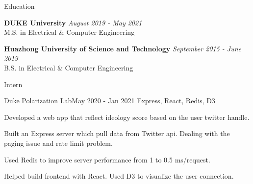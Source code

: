 \documentclass{cv}
\begin{document}
	\begin{rSection}
		{Education}

		{\bf DUKE University} \hfill {\em August 2019 - May 2021} \\ M.S. in Electrical
		\& Computer Engineering

		{\bf Huazhong University of Science and Technology } \hfill
		{\em September 2015 - June 2019} \\ B.S. in Electrical \& Computer Engineering
	\end{rSection}

	\begin{rSection}
		{Intern}
		\begin{rSubsection}
			{Duke Polarization Lab}{May 2020 - Jan 2021} {Express, React, Redis, D3}{}
			\item Developed a web app that reflect ideology score based on the user twitter
			handle. \item Built an Express server which pull data from Twitter api. Dealing
			with the paging issue and rate limit problem. \item Used Redis to improve
			server performance from 1 to 0.5 ms/request. \item Helped build frontend with
			React. Used D3 to visualize the user connection.
		\end{rSubsection}
	\end{rSection}
\end{document}
